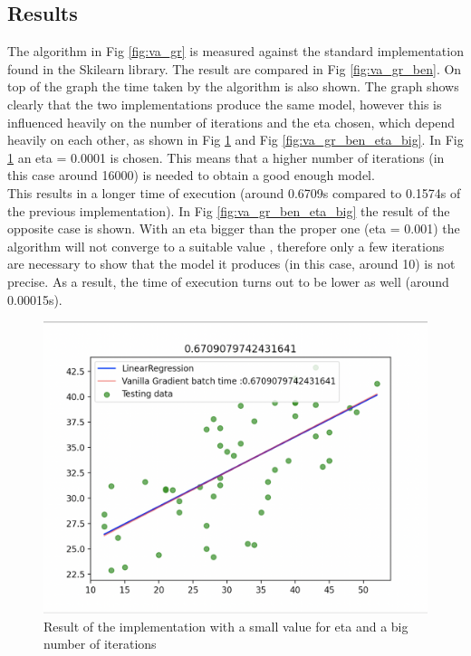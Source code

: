\documentclass[conference]{IEEEtran}
\begin{document}
\subsection{Results}
The algorithm in Fig \ref{fig:va_gr} is measured against the standard implementation found in the Skilearn library. The result are compared in Fig \ref{fig:va_gr_ben}. On top of the graph the time taken by the algorithm is also shown.
The graph shows clearly that the two implementations produce the same model, however this is influenced heavily on the number of iterations and the eta chosen, which depend heavily on each other, as shown in Fig \ref{fig:va_gr_ben_eta_small} and Fig \ref{fig:va_gr_ben_eta_big}. 
In Fig \ref{fig:va_gr_ben_eta_small} an eta = 0.0001 is chosen. This means that a higher number of iterations (in this case around 16000) is needed to obtain a good enough model.\cite{Scikit-Learn} \\
This results in a longer time of execution (around 0.6709s compared to 0.1574s of the previous implementation). 
In Fig \ref{fig:va_gr_ben_eta_big} the result of the opposite case is shown. With an eta bigger than the proper one (eta = 0.001) the algorithm will not converge to a suitable value \cite{Scikit-Learn}, therefore only a few iterations are necessary to show that the model it produces (in this case, around 10) is not precise. As a result, the time of execution turns out to be lower as well (around 0.00015s).


\begin{figure}[ht]
    \includegraphics[scale=0.4]{Figures/Fig2.png}
    \caption{Result of the implementation with a small value for eta and a big number of iterations}
    \label{fig:va_gr_ben_eta_small}
\end{figure}
\end{document}
